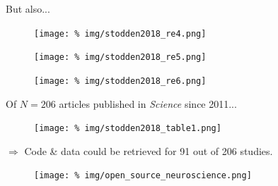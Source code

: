 \begin{frame}{But also...}
  
  \begin{figure}
    \centering
    \texttt{[image: \%
      img/stodden2018\_re4.png]} %
  \end{figure}

  \begin{figure}
    \centering
    \texttt{[image: \%
      img/stodden2018\_re5.png]} %
  \end{figure}

  \begin{figure}
    \centering
    \texttt{[image: \%
      img/stodden2018\_re6.png]} %
  \end{figure}

  
\end{frame}


\begin{frame}{\large   Of $N=206$ articles published in \textit{Science} since 2011...}


  \begin{figure}
    \centering
    \texttt{[image: \%
      img/stodden2018\_table1.png]} %
  \end{figure}

  \vspace{0.1cm}
  
  \begin{center}
    $\Rightarrow$ Code \& data could be retrieved for 91 out of 206 studies.    
  \end{center}

  
\end{frame}


\begin{frame}{}%

  \begin{figure}
    \texttt{[image: \%
      img/open\_source\_neuroscience.png]} %
  \end{figure}
  
\end{frame}



